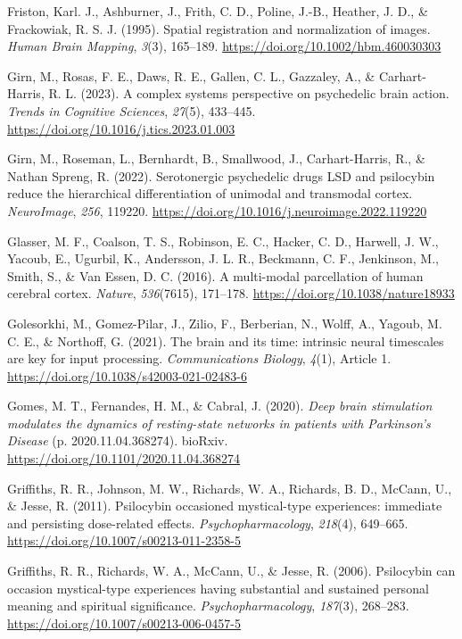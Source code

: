 \begin{CSLReferences}{1}{0}
Friston, Karl. J., Ashburner, J., Frith, C. D., Poline, J.-B., Heather,
J. D., \& Frackowiak, R. S. J. (1995). Spatial registration and
normalization of images. \emph{Human Brain Mapping}, \emph{3}(3),
165--189. \url{https://doi.org/10.1002/hbm.460030303}

Girn, M., Rosas, F. E., Daws, R. E., Gallen, C. L., Gazzaley, A., \&
Carhart-Harris, R. L. (2023). A complex systems perspective on
psychedelic brain action. \emph{Trends in Cognitive Sciences},
\emph{27}(5), 433--445. \url{https://doi.org/10.1016/j.tics.2023.01.003}

Girn, M., Roseman, L., Bernhardt, B., Smallwood, J., Carhart-Harris, R.,
\& Nathan Spreng, R. (2022). Serotonergic psychedelic drugs LSD and
psilocybin reduce the hierarchical differentiation of unimodal and
transmodal cortex. \emph{NeuroImage}, \emph{256}, 119220.
\url{https://doi.org/10.1016/j.neuroimage.2022.119220}

Glasser, M. F., Coalson, T. S., Robinson, E. C., Hacker, C. D., Harwell,
J. W., Yacoub, E., Ugurbil, K., Andersson, J. L. R., Beckmann, C. F.,
Jenkinson, M., Smith, S., \& Van Essen, D. C. (2016). A multi-modal
parcellation of human cerebral cortex. \emph{Nature}, \emph{536}(7615),
171--178. \url{https://doi.org/10.1038/nature18933}

Golesorkhi, M., Gomez-Pilar, J., Zilio, F., Berberian, N., Wolff, A.,
Yagoub, M. C. E., \& Northoff, G. (2021). The brain and its time:
intrinsic neural timescales are key for input processing.
\emph{Communications Biology}, \emph{4}(1), Article 1.
\url{https://doi.org/10.1038/s42003-021-02483-6}

Gomes, M. T., Fernandes, H. M., \& Cabral, J. (2020). \emph{Deep brain
stimulation modulates the dynamics of resting-state networks in patients
with Parkinson's Disease} (p. 2020.11.04.368274). bioRxiv.
\url{https://doi.org/10.1101/2020.11.04.368274}

Griffiths, R. R., Johnson, M. W., Richards, W. A., Richards, B. D.,
McCann, U., \& Jesse, R. (2011). Psilocybin occasioned mystical-type
experiences: immediate and persisting dose-related effects.
\emph{Psychopharmacology}, \emph{218}(4), 649--665.
\url{https://doi.org/10.1007/s00213-011-2358-5}

Griffiths, R. R., Richards, W. A., McCann, U., \& Jesse, R. (2006).
Psilocybin can occasion mystical-type experiences having substantial and
sustained personal meaning and spiritual significance.
\emph{Psychopharmacology}, \emph{187}(3), 268--283.
\url{https://doi.org/10.1007/s00213-006-0457-5}


\end{CSLReferences}
